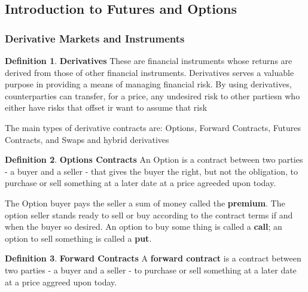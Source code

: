 \documentclass{book}
\theoremstyle{definition}
\newtheorem{definition}{Definition}[section]
\theoremstyle{remark}
\begin{document}
\subsection{Introduction to Futures and Options}
\subsubsection{Derivative Markets and Instruments}
    \begin{definition}{\textbf{Derivatives}}
    These are financial instruments whose returns are derived from those of other financial instruments. Derivatives serves a valuable purpose in providing a means of managing financial risk. By using derivatives, counterparties can transfer, for a price, any undesired risk to other partiesn who either have risks that offset ir want to assume that risk
    \end{definition}
    
    The main types of derivative contracts are: Options, Forward Contracts, Futures Contracts, and Swaps and hybrid derivatives
    
    \begin{definition} {\textbf{Options Contracts}}
        An Option is a contract between two parties - a buyer and a seller - that gives the buyer the right, but not the obligation, to purchase or sell something at a later date at a price agreeded upon today. 
        
        The Option buyer pays the seller a sum of money called the \textbf{premium}. The option seller stands ready to sell or buy according to the contract terms if and when the buyer so desired. An option to buy some thing is called a \textbf{call}; an option to sell something is called a \textbf{put}.
        \end{definition}
        
        \begin{definition}{\textbf{Forward Contracts}}
        A \textbf{forward contract} is a contract between two parties - a buyer and a seller - to purchase or sell something at a later date at a price aggreed upon today.
    \end{definition}
    
\end{document}
